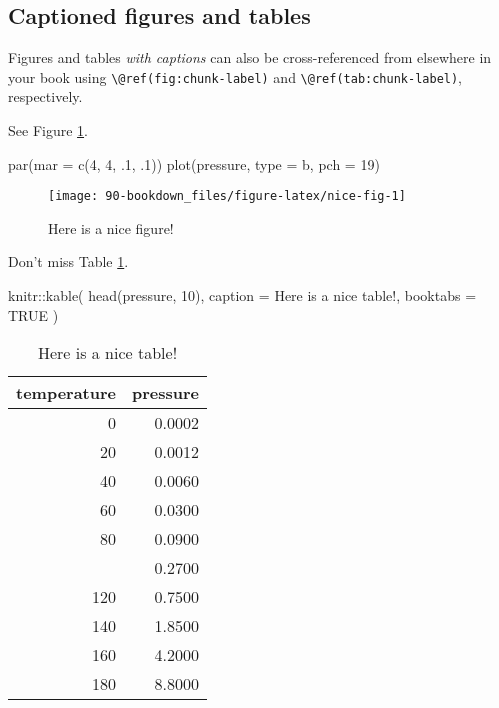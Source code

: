 \documentclass[
]{book}
\newenvironment{Shaded}{\begin{snugshade}}{\end{snugshade}}
\newcommand{\AttributeTok}[1]{\textcolor[rgb]{0.77,0.63,0.00}{#1}}
\newcommand{\ConstantTok}[1]{\textcolor[rgb]{0.00,0.00,0.00}{#1}}
\newcommand{\DecValTok}[1]{\textcolor[rgb]{0.00,0.00,0.81}{#1}}
\newcommand{\FunctionTok}[1]{\textcolor[rgb]{0.00,0.00,0.00}{#1}}
\newcommand{\NormalTok}[1]{#1}
\newcommand{\SpecialCharTok}[1]{\textcolor[rgb]{0.00,0.00,0.00}{#1}}
\newcommand{\StringTok}[1]{\textcolor[rgb]{0.31,0.60,0.02}{#1}}
\theoremstyle{definition}
\theoremstyle{definition}
\theoremstyle{definition}
\theoremstyle{definition}
\theoremstyle{remark}
\begin{document}
\hypertarget{captioned-figures-and-tables}{%
\subsection{Captioned figures and tables}\label{captioned-figures-and-tables}}

Figures and tables \emph{with captions} can also be cross-referenced from elsewhere in your book using \texttt{\textbackslash{}@ref(fig:chunk-label)} and \texttt{\textbackslash{}@ref(tab:chunk-label)}, respectively.

See Figure \ref{fig:nice-fig}.

\begin{Shaded}
\begin{Highlighting}[]
\FunctionTok{par}\NormalTok{(}\AttributeTok{mar =} \FunctionTok{c}\NormalTok{(}\DecValTok{4}\NormalTok{, }\DecValTok{4}\NormalTok{, .}\DecValTok{1}\NormalTok{, .}\DecValTok{1}\NormalTok{))}
\FunctionTok{plot}\NormalTok{(pressure, }\AttributeTok{type =} \StringTok{\textquotesingle{}b\textquotesingle{}}\NormalTok{, }\AttributeTok{pch =} \DecValTok{19}\NormalTok{)}
\end{Highlighting}
\end{Shaded}

\begin{figure}

{\centering \texttt{[image: 90-bookdown\_files/figure-latex/nice-fig-1]} 

}

\caption{Here is a nice figure!}\label{fig:nice-fig}
\end{figure}

Don't miss Table \ref{tab:nice-tab}.

\begin{Shaded}
\begin{Highlighting}[]
\NormalTok{knitr}\SpecialCharTok{::}\FunctionTok{kable}\NormalTok{(}
  \FunctionTok{head}\NormalTok{(pressure, }\DecValTok{10}\NormalTok{), }\AttributeTok{caption =} \StringTok{\textquotesingle{}Here is a nice table!\textquotesingle{}}\NormalTok{,}
  \AttributeTok{booktabs =} \ConstantTok{TRUE}
\NormalTok{)}
\end{Highlighting}
\end{Shaded}

\begin{table}

\caption{\label{tab:nice-tab}Here is a nice table!}
\centering
\begin{tabular}[t]{rr}
\toprule
temperature & pressure\\
\midrule
0 & 0.0002\\
20 & 0.0012\\
40 & 0.0060\\
60 & 0.0300\\
80 & 0.0900\\
\addlinespace
100 & 0.2700\\
120 & 0.7500\\
140 & 1.8500\\
160 & 4.2000\\
180 & 8.8000\\
\bottomrule
\end{tabular}
\end{table}
\end{document}
